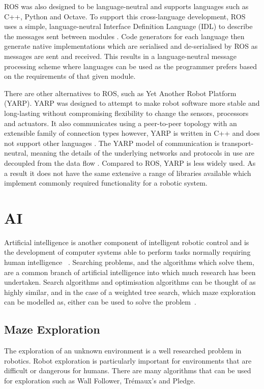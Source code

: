 ROS was also designed to be language-neutral and supports languages 
such as C++, Python and Octave. To support this cross-language 
development, ROS uses a simple, language-neutral Interface Definition 
Language (IDL) to describe the messages sent between modules 
\cite{quigley2009ros}. Code generators for each language then generate 
native implementations which are serialised and de-serialised by ROS 
as messages are sent and received. This results in a language-neutral 
message processing scheme where languages can be used as the programmer 
prefers based on the requirements of that given module. 

There are other alternatives to ROS, such as Yet Another Robot Platform 
(YARP). YARP was designed to attempt to make robot software more stable 
and long-lasting without compromising flexibility to change the sensors, 
processors and actuators. It also communicates using a peer-to-peer 
topology with an extensible family of connection types however, YARP is 
written in C++ and does not support other languages \cite{aboutYARP}.
The YARP model of communication is transport-neutral, meaning the details 
of the underlying networks and protocols in use are decoupled from the 
data flow \cite{exactlyIsYARP}. Compared to ROS, YARP is less widely used.
As a result it does not have the same extensive a range of libraries available 
which implement commonly required functionality for a robotic system.

\section{AI}\label{litreview/maze}
Artificial intelligence is another component of intelligent robotic control and is the 
development of computer systems able to perform tasks normally requiring human intelligence~
\cite{russell2016artificial}. Searching problems, and the algorithms which solve them, are a 
common branch of artificial intelligence into which much research has been undertaken. Search 
algorithms and optimisation algorithms can be thought of as highly similar, and in the case of 
a weighted tree search, which maze exploration can be modelled as, either can be used to solve the problem~\cite{kanal2012search}. 

\subsection{Maze Exploration}\label{litreview/maze/exploration}
The exploration of an unknown environment is a well researched problem in 
robotics. Robot exploration is particularly important for 
environments that are difficult or dangerous for humans. There are many
algorithms that can be used for exploration such as Wall Follower, 
Trémaux's and Pledge.

